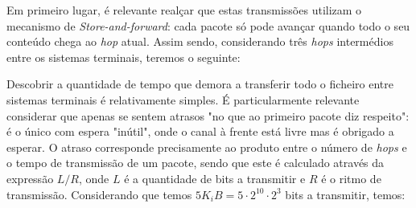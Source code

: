 
\begin{enumerate}[leftmargin=\labelsep]

        Em primeiro lugar, é relevante realçar que estas transmissões utilizam o
        mecanismo de \textit{Store-and-forward}: cada pacote só pode avançar quando
        todo o seu conteúdo chega ao \textit{hop} atual. Assim sendo, considerando
        três \textit{hops} intermédios entre os sistemas terminais, teremos o seguinte:

        \begin{figure}[H]
          \centering
          
        \end{figure}

        Descobrir a quantidade de tempo que demora a transferir todo o ficheiro
        entre sistemas terminais é relativamente simples. É particularmente
        relevante considerar que apenas se sentem atrasos "no que ao primeiro pacote
        diz respeito": é o único com espera "inútil", onde o canal à frente está livre
        mas é obrigado a esperar. O atraso corresponde precisamente ao produto
        entre o número de \textit{hops} e o tempo de transmissão de um pacote,
        sendo que este é calculado através da expressão $L/R$, onde $L$ é a
        quantidade de bits a transmitir e $R$ é o ritmo de transmissão.
        Considerando que temos $5 K_iB = 5 \cdot 2^{10} \cdot 2^3$ bits a transmitir,
        temos:


\end{enumerate}
